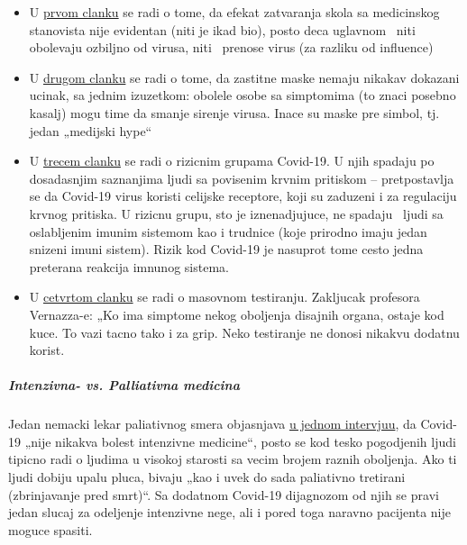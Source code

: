 \begin{itemize}
\tightlist
\item
  U
  \href{https://infekt.ch/2020/04/schulen-schliessen-hilfreich-oder-nicht/}{prvom
  clanku} se radi o tome, da efekat zatvaranja skola sa medicinskog
  stanovista nije evidentan (niti je ikad bio), posto deca uglavnom
  ~niti obolevaju ozbiljno od virusa, niti~ prenose virus (za razliku od
  influence)
\item
  U
  \href{https://infekt.ch/2020/04/atemschutzmasken-fuer-alle-medienhype-oder-unverzichtbar/}{drugom
  clanku} se radi o tome, da zastitne maske nemaju nikakav dokazani
  ucinak, sa jednim izuzetkom: obolele osobe sa simptomima (to znaci
  posebno kasalj) mogu time da smanje sirenje virusa. Inace su maske pre
  simbol, tj. jedan „medijski hype``
\item
  U
  \href{https://infekt.ch/2020/03/immunschwaeche-und-schwangerschaft-kein-covid-19-risikofaktor/}{trecem
  clanku} se radi o rizicnim grupama Covid-19. U njih spadaju po
  dosadasnjim saznanjima ljudi sa povisenim krvnim pritiskom --
  pretpostavlja se da Covid-19 virus koristi celijske receptore, koji su
  zaduzeni i za regulaciju krvnog pritiska. U rizicnu grupu, sto je
  iznenadjujuce, ne spadaju~ ljudi sa oslabljenim imunim sistemom kao i
  trudnice (koje prirodno imaju jedan snizeni imuni sistem). Rizik kod
  Covid-19 je nasuprot tome cesto jedna preterana reakcija imnunog
  sistema.
\item
  U
  \href{https://infekt.ch/2020/04/corona-testen-testen-und-kein-ende/}{cetvrtom
  clanku} se radi o masovnom testiranju. Zakljucak profesora Vernazza-e:
  „Ko ima simptome nekog oboljenja disajnih organa, ostaje kod kuce. To
  vazi tacno tako i za grip. Neko testiranje ne donosi nikakvu dodatnu
  korist.
\end{itemize}

\hypertarget{intenzivna--vs-palliativna-medicina}{%
\subparagraph{\texorpdfstring{\textbf{Intenzivna- vs. Palliativna
medicina}}{Intenzivna- vs. Palliativna medicina}}\label{intenzivna--vs-palliativna-medicina}}

Jedan nemacki lekar paliativnog smera objasnjava
\href{https://www.ruhr24.de/ruhrgebiet/coronavirus-behandlung-intensivstation-nrw-lungenentzuendung-matthias-thoens-witten-zr-13645038.html}{u
jednom intervjuu}, da Covid-19 „nije nikakva bolest intenzivne
medicine``, posto se kod tesko pogodjenih ljudi tipicno radi o ljudima u
visokoj starosti sa vecim brojem raznih oboljenja. Ako ti ljudi dobiju
upalu pluca, bivaju „kao i uvek do sada paliativno tretirani
(zbrinjavanje pred smrt)``. Sa dodatnom Covid-19 dijagnozom od njih se
pravi jedan slucaj za odeljenje intenzivne nege, ali i pored toga
naravno pacijenta nije moguce spasiti.

